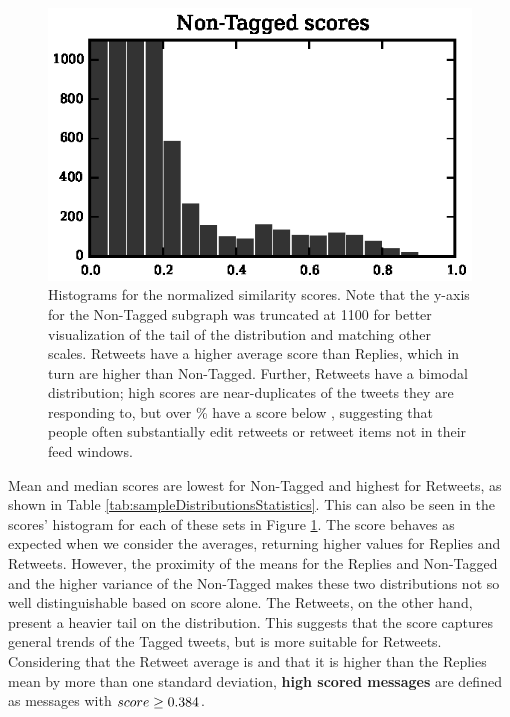 \begin{figure}[!htbp]
\includegraphics{./figures/not_retweets_replies_tfidf_histogram_cutoff_y.eps}
\caption{Histograms for the normalized similarity scores.  Note that the y-axis for the Non-Tagged subgraph was truncated at 1100 for better visualization of the tail of the distribution and matching other scales.  Retweets have a higher average score than Replies, which in turn are higher than Non-Tagged.  Further, Retweets have a bimodal distribution; high scores are near-duplicates of the tweets they are responding to, but over \lowRetweetCountPct{}\% have a score below \thresholdScore{}, suggesting that people often substantially edit retweets or retweet items not in their feed windows.}
\label{fig:fig_tweets_histograms}
\end{figure}

Mean and median scores are lowest for Non-Tagged and highest for Retweets, as shown in Table \ref{tab:sampleDistributionsStatistics}. This can also be seen in the scores' histogram for each of these sets in Figure \ref{fig:fig_tweets_histograms}. The score behaves as expected when we consider the averages, returning higher values for Replies and Retweets. However, the proximity of the means for the Replies and Non-Tagged and the higher variance of the Non-Tagged makes these two distributions not so well distinguishable based on score alone. The Retweets, on the other hand, present a heavier tail on the distribution. This suggests that the score captures general trends of the Tagged tweets, but is more suitable for Retweets. Considering that the Retweet average is \thresholdScore{} and that it is higher than the Replies mean by more than one standard deviation, \textbf{high scored messages} are defined as messages with $score \geq 0.384{}$.


